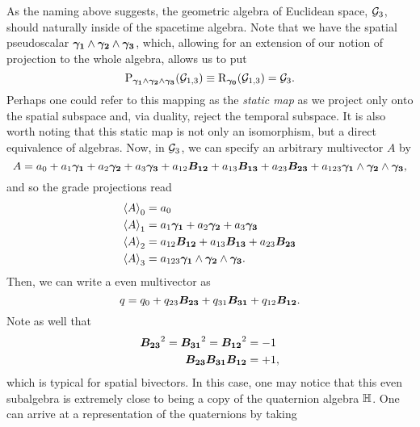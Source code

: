 As the naming above suggests, the geometric algebra of Euclidean space, $\G_3$, should naturally inside of the spacetime algebra. Note that we have the spatial pseudoscalar $\blade{\gamma_1} \wedge \blade{\gamma_2} \wedge \blade{\gamma_3}$, which, allowing for an extension of our notion of projection to the whole algebra, allows us to put
\begin{equation}
\projection_{\blade{\gamma_1} \wedge \blade{\gamma_2} \wedge \blade{\gamma_3}}(\G_{1,3}) \equiv \rejection_{\blade{\gamma_0}} (\G_{1,3}) = \G_3.
\end{equation}
Perhaps one could refer to this mapping as the \emph{static map} as we project only onto the spatial subspace and, via duality, reject the temporal subspace. It is also worth noting that this static map is not only an isomorphism, but a direct equivalence of algebras. Now, in $\G_3$, we can specify an arbitrary multivector $A$ by
\begin{equation}
A= a_0 + a_1 \blade{\gamma_1} + a_2 \blade{\gamma_2} + a_3 \blade{\gamma_3} + a_{12} \blade{B_{12}} + a_{13} \blade{B_{13}} + a_{23} \blade{B_{23}} + a_{123} \blade{\gamma_1} \wedge \blade{\gamma_2} \wedge \blade{\gamma_3},
\end{equation}
and so the grade projections read
\begin{subequations}
\begin{align}
\proj{0}{A}&=a_0\\
\proj{1}{A}&=a_1 \blade{\gamma_1} + a_2 \blade{\gamma_2} + a_3 \blade{\gamma_3}\\
\proj{2}{A}&=a_{12} \blade{B_{12}} + a_{13} \blade{B_{13}} + a_{23} \blade{B_{23}}\\
\proj{3}{A}&= a_{123} \blade{\gamma_1} \wedge \blade{\gamma_2} \wedge \blade{\gamma_3}.
\end{align}
\end{subequations}
Then, we can write a even multivector as
\begin{equation}
q = q_0 + q_{23}\blade{B_{23}} + q_{31} \blade{B_{31}} + q_{12} \blade{B_{12}}.
\end{equation}
Note as well that
\begin{subequations}
\begin{align}
\blade{B_{23}}^2 = \blade{B_{31}}^2 = \blade{B_{12}}^2 &= -1\\
\blade{B_{23}}\blade{B_{31}}\blade{B_{12}} &= +1,
\end{align}
\end{subequations}
which is typical for spatial bivectors. In this case, one may notice that this even subalgebra is extremely close to being a copy of the quaternion algebra $\quat$. One can arrive at a representation of the quaternions by taking

